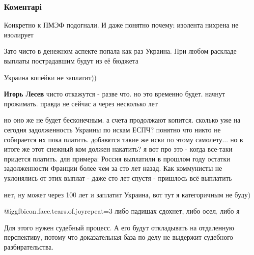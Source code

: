  
 
 
 
 
\subsubsection{Коментарі}

\begin{itemize} %
Конкретно к ПМЭФ подогнали. И даже понятно почему: изолента нихрена не изолирует

Зато чисто в денежном аспекте попала как раз Украина. При любом раскладе выплаты пострадавшим будут из её бюджета

\begin{itemize} %
Украина копейки не заплатит))

\textbf{Игорь Лесев} чисто откажутся - разве что. но это временно будет. начнут прожимать. правда не сейчас а через несколько лет


но оно же не будет бесконечным. а счета продолжают копится. сколько уже на
сегодня задолженность Украины по искам ЕСПЧ? понятно что никто не собирается их
пока платить. добавятся такие же иски по этому самолету... но в итоге же этот
снежный ком должен накатить? я вот про это - когда все-таки придется платить.
для примера: Россия выплатили в прошлом году остатки задолженности Франции
более чем за сто лет назад. Как коммунисты не уклонялись от этих выплат - даже
сто лет спустя - пришлось всё выплатить


нет, ну может через 100 лет и заплатит Украина, вот тут я категоричным не буду)

 @igg{fbicon.face.tears.of.joy}{repeat=3} либо падишах сдохнет, либо осел, либо я


Для этого нужен судебный процесс. А его будут откладывать на отдаленную
перспективу, потому что доказательная база по делу не выдержит судебного
разбирательства.

\end{itemize} %


\end{itemize}

